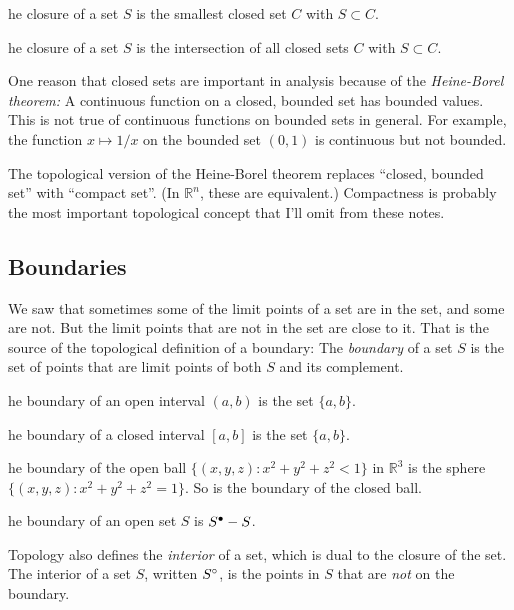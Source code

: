 \documentclass{article}
\def\R{{\mathbb R}}
\def\Rn{{\R^n}}
\newcounter{exercisecounter}\setcounter{exercisecounter}{1}
\def\Exercise.#1\par{{\item\small \makebox{\bf Exercise \number\theexercisecounter.\hspace{0.5em}}\unskip\ignorespaces#1\addtocounter{exercisecounter}{1}}}
\def\inter#1{\smash{#1}^\circ\vphantom{#1}}
\def\clos#1{\smash{#1}^\bullet\vphantom{#1}}
\begin{document}
\begin{itemize}
\Exercise. The closure of a set $S$ is the smallest closed set $C$
with $S\subset C$.

\Exercise. The closure of a set $S$ is the intersection of all closed sets $C$
with $S\subset C$.


\end{itemize}

One reason that closed sets are important in analysis because of the
{\em Heine-Borel theorem:\/} A continuous function on a closed,
bounded set has bounded values.  This is not true of continuous
functions on bounded sets in general.  For example, the function $x
\mapsto 1/x$ on the bounded set $(0, 1)$ is continuous but not
bounded.

The topological version of the Heine-Borel theorem replaces ``closed,
bounded set'' with ``compact set''.  (In $\Rn$, these are equivalent.)
Compactness is probably the most important topological concept that
I'll omit from these notes.

\subsection*{Boundaries}

We saw that sometimes some of the limit points of a set are in the
set, and some are not.  But the limit points that are not in the set
are close to it.  That is the source of the topological definition of
a boundary: The {\em boundary\/} of a set $S$ is the set of points
that are limit points of both $S$ and its complement.

\begin{itemize}
\Exercise. The boundary of an open interval $(a, b)$ is the set $\{a, b\}$.

\Exercise. The boundary of a closed interval $[a, b]$ is the set $\{a, b\}$.

\Exercise. The boundary of the open ball $\{(x,y,z) : x^2 + y^2 + z^2 <
1\}$ in $\R^3$ is the sphere  $\{(x,y,z) : x^2 + y^2 + z^2 = 1\}$.   So
is the boundary of the closed ball. 

\Exercise. The boundary of an open set $S$ is $\clos S - S$.

\end{itemize}

Topology also defines the {\em interior\/} of a set, which is dual to
the closure of the set.  The interior of a set $S$, written $\inter
S$, is the points in $S$ that are {\em not\/} on the boundary.
\end{document}
